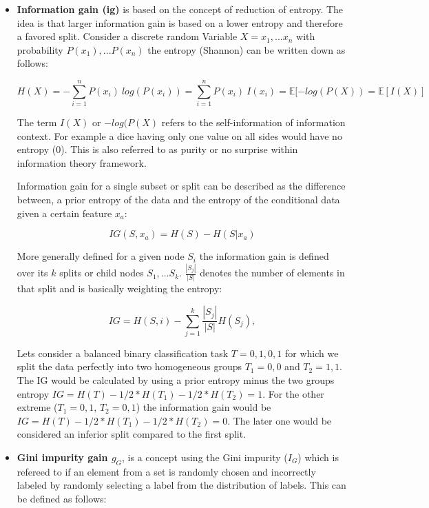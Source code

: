 \documentclass[../main.tex]{subfiles}
\begin{document}
\begin{itemize}
    \item \textbf{Information gain (\acs{ig})} is based on the concept of reduction of entropy. The idea is that larger information gain is based on a lower entropy and therefore a favored split. Consider a discrete random Variable $X={x_1,...x_n}$ with probability $P(x_1),...P(x_n)$ the entropy (Shannon) can be written down as follows:

    \begin{equation}    
        H(X) = -\sum_{i=1}^{n} P(x_i) \ log(P(x_i)) =  \sum_{i=1}^{n} P(x_i) \ I(x_i) = \mathbb{E}[-log(P(X)) = \mathbb{E}[I(X)]
    \end{equation}

    The term $I(X)$ or $-log(P(X)$ refers to the self-information of information context. For example a dice having only one value on all sides would have no entropy (0). This is also referred to as purity or no surprise within information theory framework.

    Information gain for a single subset or split can be described as the difference between, a prior entropy of the data and the entropy of the conditional data given a certain feature $x_a$:

    \begin{equation}
        IG(S, x_a) = H(S)-H(S|x_a)
    \end{equation}

    More generally defined for a given node $S_i$ the information gain is defined over its $k$ splits or child nodes $S_1, \ldots S_k$. $\frac{|S_j|}{|S|}$ denotes the number of elements in that split and is basically weighting the entropy:

    \begin{equation}
        IG = H(S,i) - \sum_{j=1}^{k} \frac{|S_j|}{|S|} H(S_j), 
    \end{equation}

    Lets consider a balanced binary classification task $T={0,1,0,1}$ for which we split the data perfectly into two homogeneous groups $T_1={0,0}$ and $T_2={1,1}$. The IG would be calculated by using a prior entropy minus the two groups entropy $IG=H(T)-1/2 * H(T_1)-1/2* H(T_2)=1$. For the other extreme ($T_1={0,1}$, $T_2={0,1}$) the information gain would be $IG=H(T)-1/2 * H(T_1)-1/2 * H(T_2)=0$. The later one would be considered an inferior split compared to the first split.

    \item \textbf{Gini impurity gain $g_G$}, is a concept using the Gini impurity ($I_G$) which is refereed to if an element from a set is randomly chosen and incorrectly labeled by randomly selecting a label from the distribution of labels. This can be defined as follows:


\end{itemize}
\end{document}
